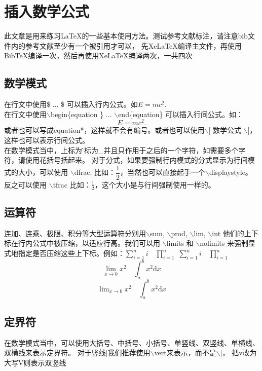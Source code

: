 \section{插入数学公式}
此文章是用来练习\LaTeX{}的一些基本使用方法\cite{hasegawa2000plant,sunliguang2016jidi,tester2003na,zhu2002salt,mittler2002oxidative,shi2002regulation,verslues2005new,flowers1995breeding,varshney2005genomics,rengasamy2006world}。测试参考文献标注，请注意bib文件内的参考文献至少有一个被引用才可以，
先XeLaTeX编译主文件，再使用BibTeX编译一次，然后再使用XeLaTeX编译两次，一共四次\cite{sunliguang2016jidi}
\subsection{数学模式}
在行文中使用\$ ... \$ 可以插入行内公式。如$E=mc^2$.\\
在行文中使用$\backslash$begin\{equation \} ... $\backslash$end\{equation\} 可以插入行间公式。如：
\begin{equation}
E=mc^2.
\end{equation}
或者也可以写成equation*，这样就不会有编号。或者也可以使用$\backslash$[ 数学公式 $\backslash$]，
这样也可以表示行间公式。\\在数学模式当中，上标为\^下标为\_并且只作用于之后的一个字符，如需要多个字符，请使用花括号括起来。
对于分式，如果要强制行内模式的分式显示为行间模式的大小，可以使用 $\backslash$dfrac, 
比如：$ \dfrac{1}{2} $，当然也可以直接起手一个$\backslash$displaystyle。
反之可以使用 $\backslash$tfrac
比如：$ \tfrac{1}{2} $，这个大小是与行间强制使用一样的。
\subsection{运算符}
连加、连乘、极限、积分等大型运算符分别用$\backslash$sum, $\backslash$prod, $\backslash$lim, $\backslash$int
他们的上下标在行内公式中被压缩，以适应行高。我们可以用 $\backslash$limits 和 $\backslash$nolimits
来强制显式地指定是否压缩这些上下标。例如：$ \sum_{i=1}^n i\quad \prod_{i=1}^n $
$ \sum\limits _{i=1}^n i\quad \prod\limits _{i=1}^n $
\[ \lim_{x\to0}x^2 \quad \int_a^b x^2 \mathrm{d}{x} \]
\[ \lim\nolimits _{x\to0}x^2\quad \int\nolimits_a^b x^2 \mathrm{d}{x} \]
\subsection{定界符}
在数学模式当中，可以使用大括号、中括号、小括号、单竖线、双竖线、单横线、双横线来表示定界符。
对于竖线$\vert$我们推荐使用$\backslash$vert来表示，而不是$\backslash \vert$，
把v改为大写V则表示双竖线

